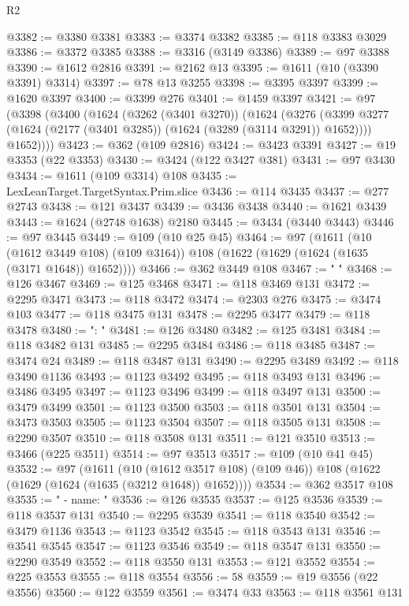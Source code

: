 \begin{lexlean}{R2}
\begin{coremodule}
@3382 := @3380 @3381
@3383 := @3374 @3382
@3385 := @118 @3383 @3029
@3386 := @3372 @3385
@3388 := @3316 (@3149 @3386)
@3389 := @97 @3388
@3390 := @1612 @2816
@3391 := @2162 @13
@3395 := @1611 (@10 (@3390 @3391) @3314)
@3397 := @78 @13 @3255
@3398 := @3395 @3397
@3399 := @1620 @3397
@3400 := @3399 @276
@3401 := @1459 @3397
@3421 := @97
    (@3398
      (@3400
        (@1624
          (@3262 (@3401 @3270))
          (@1624
            (@3276 (@3399 @3277 (@1624 (@2177 (@3401 @3285)) (@1624 (@3289 (@3114 @3291)) @1652))))
            @1652))))
@3423 := @362 (@109 @2816)
@3424 := @3423 @3391
@3427 := @19 @3353 (@22 @3353)
@3430 := @3424 (@122 @3427 @381)
@3431 := @97 @3430
@3434 := @1611 (@109 @3314) @108
@3435 := LexLeanTarget.TargetSyntax.Prim.slice
@3436 := @114 @3435
@3437 := @277 @2743
@3438 := @121 @3437
@3439 := @3436 @3438
@3440 := @1621 @3439
@3443 := @1624 (@2748 @1638) @2180
@3445 := @3434 (@3440 @3443)
@3446 := @97 @3445
@3449 := @109 (@10 @25 @45)
@3464 := @97
    (@1611
      (@10 (@1612 @3449 @108) (@109 @3164))
      @108
      (@1622 (@1629 (@1624 (@1635 (@3171 @1648)) @1652))))
@3466 := @362 @3449 @108
@3467 := "      "
@3468 := @126 @3467
@3469 := @125 @3468
@3471 := @118 @3469 @131
@3472 := @2295 @3471
@3473 := @118 @3472
@3474 := @2303 @276
@3475 := @3474 @103
@3477 := @118 @3475 @131
@3478 := @2295 @3477
@3479 := @118 @3478
@3480 := ": "
@3481 := @126 @3480
@3482 := @125 @3481
@3484 := @118 @3482 @131
@3485 := @2295 @3484
@3486 := @118 @3485
@3487 := @3474 @24
@3489 := @118 @3487 @131
@3490 := @2295 @3489
@3492 := @118 @3490 @1136
@3493 := @1123 @3492
@3495 := @118 @3493 @131
@3496 := @3486 @3495
@3497 := @1123 @3496
@3499 := @118 @3497 @131
@3500 := @3479 @3499
@3501 := @1123 @3500
@3503 := @118 @3501 @131
@3504 := @3473 @3503
@3505 := @1123 @3504
@3507 := @118 @3505 @131
@3508 := @2290 @3507
@3510 := @118 @3508 @131
@3511 := @121 @3510
@3513 := @3466 (@225 @3511)
@3514 := @97 @3513
@3517 := @109 (@10 @41 @45)
@3532 := @97
    (@1611
      (@10 (@1612 @3517 @108) (@109 @46))
      @108
      (@1622 (@1629 (@1624 (@1635 (@3212 @1648)) @1652))))
@3534 := @362 @3517 @108
@3535 := "      - name: "
@3536 := @126 @3535
@3537 := @125 @3536
@3539 := @118 @3537 @131
@3540 := @2295 @3539
@3541 := @118 @3540
@3542 := @3479 @1136
@3543 := @1123 @3542
@3545 := @118 @3543 @131
@3546 := @3541 @3545
@3547 := @1123 @3546
@3549 := @118 @3547 @131
@3550 := @2290 @3549
@3552 := @118 @3550 @131
@3553 := @121 @3552
@3554 := @225 @3553
@3555 := @118 @3554
@3556 := 58
@3559 := @19 @3556 (@22 @3556)
@3560 := @122 @3559
@3561 := @3474 @33
@3563 := @118 @3561 @131

\end{coremodule}
\end{lexlean}

